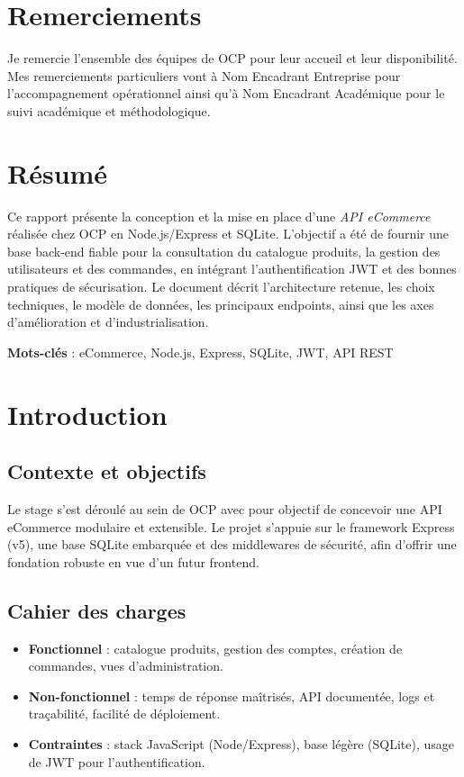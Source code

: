 \documentclass[12pt,a4paper]{report}
\newcommand{\entreprise}{OCP}
\newcommand{\encadrantE}{Nom Encadrant Entreprise}
\newcommand{\encadrantA}{Nom Encadrant Académique}
\begin{document}
\chapter*{Remerciements}
Je remercie l'ensemble des équipes de \entreprise{} pour leur accueil et leur disponibilité. Mes remerciements particuliers vont à \encadrantE{} pour l'accompagnement opérationnel ainsi qu'à \encadrantA{} pour le suivi académique et méthodologique.

\chapter*{Résumé}
Ce rapport présente la conception et la mise en place d'une \textit{API eCommerce} réalisée chez \entreprise{} en Node.js/Express et SQLite. L'objectif a été de fournir une base back-end fiable pour la consultation du catalogue produits, la gestion des utilisateurs et des commandes, en intégrant l'authentification JWT et des bonnes pratiques de sécurisation. Le document décrit l'architecture retenue, les choix techniques, le modèle de données, les principaux endpoints, ainsi que les axes d'amélioration et d'industrialisation.

\textbf{Mots-clés} : eCommerce, Node.js, Express, SQLite, JWT, API REST

\tableofcontents
\listoffigures
\listoftables

\chapter{Introduction}
\section{Contexte et objectifs}
Le stage s'est déroulé au sein de \entreprise{} avec pour objectif de concevoir une API eCommerce modulaire et extensible. Le projet s'appuie sur le framework Express (v5), une base SQLite embarquée et des middlewares de sécurité, afin d'offrir une fondation robuste en vue d'un futur frontend.

\section{Cahier des charges}
\begin{itemize}
  \item \textbf{Fonctionnel} : catalogue produits, gestion des comptes, création de commandes, vues d'administration.
  \item \textbf{Non-fonctionnel} : temps de réponse maîtrisés, API documentée, logs et traçabilité, facilité de déploiement.
  \item \textbf{Contraintes} : stack JavaScript (Node/Express), base légère (SQLite), usage de JWT pour l'authentification.
\end{itemize}
\end{document}
